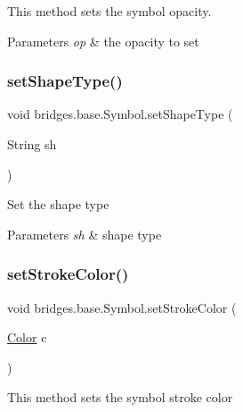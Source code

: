 This method sets the symbol opacity. 


\begin{DoxyParams}{Parameters}
{\em op} & the opacity to set \\
\hline
\end{DoxyParams}
\mbox{\label{classbridges_1_1base_1_1_symbol_adf9559ecef8902f83cbb6bbefdf1c601}} 
\subsubsection{\texorpdfstring{set\+Shape\+Type()}{setShapeType()}}
{\footnotesize\ttfamily void bridges.\+base.\+Symbol.\+set\+Shape\+Type (\begin{DoxyParamCaption}\item[{String}]{sh }\end{DoxyParamCaption})\hspace{0.3cm}{\ttfamily [protected]}}

Set the shape type 
\begin{DoxyParams}{Parameters}
{\em sh} & shape type \\
\hline
\end{DoxyParams}
\mbox{\label{classbridges_1_1base_1_1_symbol_a387a5a5691e55e84a1d0367ca2066806}} 
\subsubsection{\texorpdfstring{set\+Stroke\+Color()}{setStrokeColor()}\hspace{0.1cm}{\footnotesize\ttfamily [1/2]}}
{\footnotesize\ttfamily void bridges.\+base.\+Symbol.\+set\+Stroke\+Color (\begin{DoxyParamCaption}\item[{\hyperlink{classbridges_1_1base_1_1_color}{Color}}]{c }\end{DoxyParamCaption})}

This method sets the symbol stroke color


